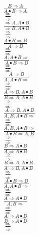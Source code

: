 \documentclass[11pt]{article}
\begin{document}
\begin{center}

$\frac{B\Rightarrow A}{A\bullet B\Rightarrow A}$
\bigskip
\\$\frac{\Rightarrow }{\Rightarrow }$
\bigskip
\\$\frac{\Rightarrow A, A\bullet B}{\Rightarrow B, A\bullet B}$
\bigskip
\\$\frac{\Rightarrow }{\Rightarrow }$
\bigskip
\\$\frac{A\bullet B\Rightarrow B}{A\Rightarrow B}$
\bigskip
\\$\frac{\Rightarrow }{\Rightarrow }$
\bigskip
\\$\frac{A, A\bullet B\Rightarrow }{A\bullet B\Rightarrow B}$
\bigskip
\\$\frac{\Rightarrow }{\Rightarrow }$
\bigskip
\\$\frac{A\Rightarrow B}{A, A\bullet B\Rightarrow }$
\bigskip
\\$\frac{\Rightarrow }{\Rightarrow }$
\bigskip
\\$\frac{A\Rightarrow B, A\bullet B}{B\Rightarrow A, A\bullet B}$
\bigskip
\\$\frac{\Rightarrow }{\Rightarrow }$
\bigskip
\\$\frac{A\Rightarrow B, A\bullet B}{A, B, A\bullet B\Rightarrow }$
\bigskip
\\$\frac{\Rightarrow }{\Rightarrow }$
\bigskip
\\$\frac{A, B, A\bullet B\Rightarrow }{A\bullet B\Rightarrow A, B}$
\bigskip
\\$\frac{\Rightarrow }{\Rightarrow }$
\bigskip
\\$\frac{B\Rightarrow A\bullet B}{A\Rightarrow A\bullet B}$
\bigskip
\\$\frac{\Rightarrow }{\Rightarrow }$
\bigskip
\\$\frac{B\Rightarrow A, A\bullet B}{A\Rightarrow B, A\bullet B}$
\bigskip
\\$\frac{\Rightarrow }{\Rightarrow }$
\bigskip
\\$\frac{A\bullet B\Rightarrow B}{A, A\bullet B\Rightarrow }$
\bigskip
\\$\frac{\Rightarrow }{\Rightarrow }$
\bigskip
\\$\frac{A\Rightarrow A\bullet B}{A, B\Rightarrow }$
\bigskip
\\$\frac{\Rightarrow }{\Rightarrow }$
\bigskip
\\$\frac{A\Rightarrow A\bullet B}{B\Rightarrow A\bullet B}$
\bigskip
\\$\frac{\Rightarrow }{\Rightarrow }$
\bigskip

\end{center}
\end{document}
